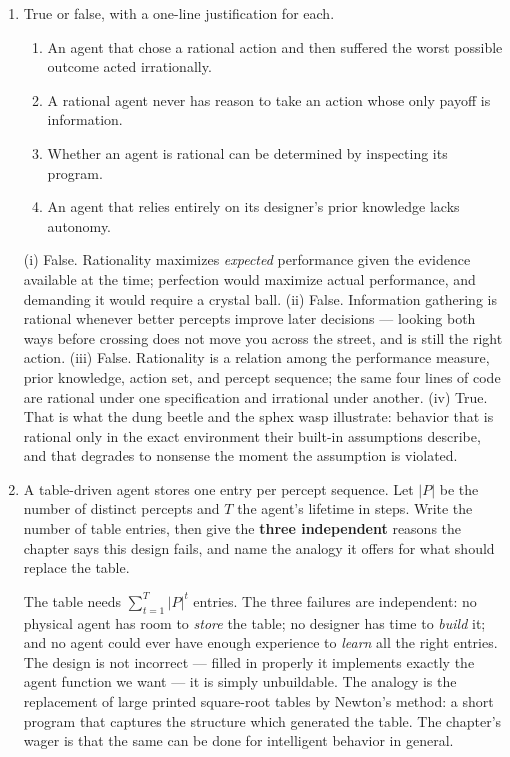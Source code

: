 \documentclass[11pt]{article}
\newif\ifsol
\newcommand{\ans}[1]{\ifsol\relax\else\vspace{#1}\filbreak\fi}
\newenvironment{solution}
  {\ifsol
     \par\vspace{4pt}\noindent
     \color{solgreen}\textbf{Solution.}\enspace\itshape\ignorespaces
   \else
     \setbox0\vbox\bgroup
   \fi}
  {\ifsol\par\normalcolor\upshape\vspace{4pt}\else\egroup\fi}
\begin{document}
\begin{enumerate}[label=(\alph*),leftmargin=*]
\item True or false, with a one-line justification for each.

\begin{enumerate}[label=(\roman*),leftmargin=1.2em,itemsep=4pt]
\item An agent that chose a rational action and then suffered the worst possible outcome
acted irrationally. \ifsol{\color{solgreen}\textbf{~F}}\fi
\item A rational agent never has reason to take an action whose only payoff is information.
\ifsol{\color{solgreen}\textbf{~F}}\fi
\item Whether an agent is rational can be determined by inspecting its program.
\ifsol{\color{solgreen}\textbf{~F}}\fi
\item An agent that relies entirely on its designer's prior knowledge lacks autonomy.
\ifsol{\color{solgreen}\textbf{~T}}\fi
\end{enumerate}
\ans{1.1in}
\begin{solution}
(i) False. Rationality maximizes \emph{expected} performance given the evidence available at
the time; perfection would maximize actual performance, and demanding it would require a
crystal ball. (ii) False. Information gathering is rational whenever better percepts improve
later decisions --- looking both ways before crossing does not move you across the street,
and is still the right action. (iii) False. Rationality is a relation among the performance
measure, prior knowledge, action set, and percept sequence; the same four lines of code are
rational under one specification and irrational under another. (iv) True. That is what the
dung beetle and the sphex wasp illustrate: behavior that is rational only in the exact
environment their built-in assumptions describe, and that degrades to nonsense the moment
the assumption is violated.
\end{solution}

\item A table-driven agent stores one entry per percept sequence. Let $|P|$ be the number of
distinct percepts and $T$ the agent's lifetime in steps. Write the number of table entries,
then give the \textbf{three independent} reasons the chapter says this design fails, and name
the analogy it offers for what should replace the table.
\ans{1.3in}
\begin{solution}
The table needs $\sum_{t=1}^{T}|P|^{t}$ entries. The three failures are independent: no
physical agent has room to \emph{store} the table; no designer has time to \emph{build} it;
and no agent could ever have enough experience to \emph{learn} all the right entries. The
design is not incorrect --- filled in properly it implements exactly the agent function we
want --- it is simply unbuildable. The analogy is the replacement of large printed
square-root tables by Newton's method: a short program that captures the structure which
generated the table. The chapter's wager is that the same can be done for intelligent
behavior in general.
\end{solution}


\end{enumerate}
\end{document}
